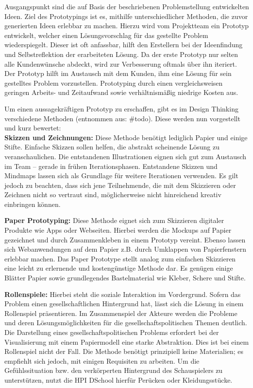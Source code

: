 Ausgangspunkt sind die auf Basis der beschriebenen Problemstellung entwickelten Ideen. Ziel des Prototypings ist es, mithilfe unterschiedlicher Methoden, die zuvor generierten Ideen erlebbar zu machen. Hierzu wird vom Projektteam ein Prototyp entwickelt, welcher einen Lösungsvorschlag für das gestellte Problem wiederspiegelt. Dieser ist oft anfassbar, hilft den Erstellern bei der Ideenfindung und Selbstreflektion der erarbeiteten Lösung. Da der erste Prototyp nur selten alle Kundenwünsche abdeckt, wird zur Verbesserung oftmals über ihn iteriert. Der Prototyp hilft im Austausch mit dem Kunden, ihm eine Lösung für sein gestelltes Problem vorzustellen. Prototyping durch einen vergleichsweisen geringen Arbeits- und Zeitaufwand sowie verhältnismäßig niedrige Kosten aus.

Um einen aussagekräftigen Prototyp zu erschaffen, gibt es im Design Thinking verschiedene Methoden (entnommen aus: \#todo). Diese werden nun vorgestellt und kurz bewertet: \\

\textbf{Skizzen und Zeichnungen:}	Diese Methode benötigt lediglich Papier und einige Stifte. Einfache Skizzen sollen helfen, die abstrakt scheinende Lösung zu veranschaulichen. Die entstandenen Illustrationen eignen sich gut zum Austausch im Team – gerade in frühen Iterationsphasen. Entstandene Skizzen und Mindmaps lassen sich als Grundlage für weitere Iterationen verwenden. Es gilt jedoch zu beachten, dass sich jene Teilnehmende, die mit dem Skizzieren oder Zeichnen nicht so vertraut sind, möglicherweise nicht hinreichend kreativ einbringen können.

\textbf{Paper Prototyping:} Diese Methode eignet sich zum Skizzieren digitaler Produkte wie Apps oder Webseiten. Hierbei werden die Mockups auf Papier gezeichnet und durch Zusammenkleben in einem Prototyp vereint. Ebenso lassen sich Webanwendungen auf dem Papier z.B. durch Umklappen von Papierfenstern erlebbar machen. Das Paper Prototype stellt analog zum einfachen Skizzieren eine leicht zu erlernende und kostengünstige Methode dar. Es genügen einige Blätter Papier sowie grundlegendes Bastelmaterial wie Kleber, Schere und Stifte.

\textbf{Rollenspiele:}	Hierbei steht die soziale Interaktion im Vordergrund. Sofern das Problem einen gesellschaftlichen Hintergrund hat, lässt sich die Lösung in einem Rollenspiel präsentieren. Im Zusammenspiel der Akteure werden die Probleme und deren Lösungsmöglichkeiten für die gesellschaftspolitischen Themen deutlich. Die Darstellung eines gesellschaftspolitischen Problems erfordert bei der Visualisierung mit einem Papiermodell eine starke Abstraktion. Dies ist bei einem Rollenspiel nicht der Fall. \newline
Die Methode benötigt prinzipiell keine Materialien; es empfiehlt sich jedoch, mit einigen Requisiten zu arbeiten. Um die Gefühlssituation bzw. den verkörperten Hintergrund des Schauspielers zu unterstützen, nutzt die HPI DSchool hierfür Perücken oder Kleidungsstücke.


